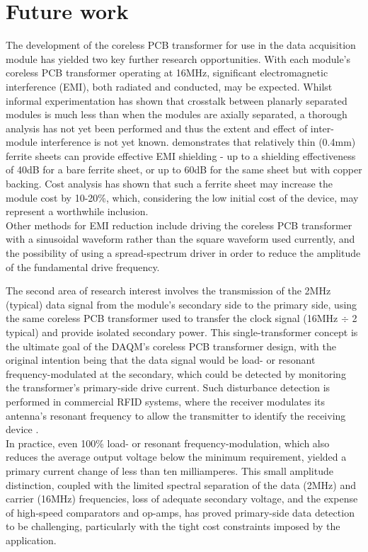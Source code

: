 \documentclass[conference]{IEEEtran}
\begin{document}
\section{Future work}
The development of the coreless PCB transformer for use in the data acquisition module has yielded two key further research opportunities.  
With each module's coreless PCB transformer operating at 16MHz, significant electromagnetic interference (EMI), both radiated and conducted, may be expected.  Whilst informal experimentation has shown that crosstalk between planarly separated modules is much less than when the modules are axially separated, a thorough analysis has not yet been performed and thus the extent and effect of inter-module interference is not yet known.  \cite{EMIShield} demonstrates that relatively thin (0.4mm) ferrite sheets can provide effective EMI shielding - up to a shielding effectiveness of 40dB for a bare ferrite sheet, or up to 60dB for the same sheet but with copper backing.  Cost analysis has shown that such a ferrite sheet may increase the module cost by 10-20\%, which, considering the low initial cost of the device, may represent a worthwhile inclusion.  \\
Other methods for EMI reduction include driving the coreless PCB transformer with a sinusoidal waveform rather than the square waveform used currently, and the possibility of using a spread-spectrum driver in order to reduce the amplitude of the fundamental drive frequency.

The second area of research interest involves the transmission of the 2MHz (typical) data signal from the module's secondary side to the primary side, using the same coreless PCB transformer used to transfer the clock signal (16MHz $ \div $ 2 typical) and provide isolated secondary power.  This single-transformer concept is the ultimate goal of the DAQM's coreless PCB transformer design, with the original intention being that the data signal would be load- or resonant frequency-modulated at the secondary, which could be detected by monitoring the transformer's primary-side drive current.  Such disturbance detection is performed in commercial RFID systems, where the receiver modulates its antenna's resonant frequency to allow the transmitter to identify the receiving device \cite{RFID}.  \\
In practice, even 100\% load- or resonant frequency-modulation, which also reduces the average output voltage below the minimum requirement, yielded a primary current change of less than ten milliamperes.  This small amplitude distinction, coupled with the limited spectral separation of the data (2MHz) and carrier (16MHz) frequencies, loss of adequate secondary voltage, and the expense of high-speed comparators and op-amps, has proved primary-side data detection to be challenging, particularly with the tight cost constraints imposed by the application.
\end{document}
